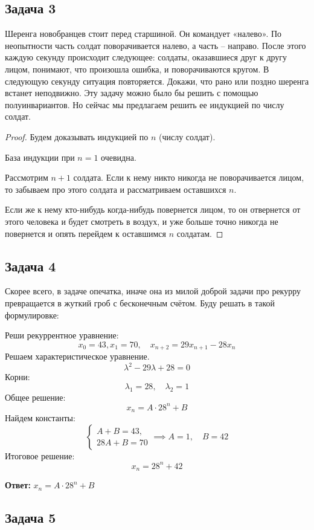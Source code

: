 \subsection{Задача 3}

Шеренга новобранцев стоит перед старшиной. Он командует «налево». По неопытности часть солдат поворачивается налево, а часть – направо. После этого каждую
секунду происходит следующее: солдаты, оказавшиеся друг к другу лицом, понимают, что произошла ошибка, и поворачиваются кругом. В следующую секунду ситуация
повторяется. Докажи, что рано или поздно шеренга встанет неподвижно.
Эту задачу можно было бы решить с помощью полуинвариантов. Но сейчас мы предлагаем
решить ее индукцией по числу солдат.

\begin{proof}
Будем доказывать индукцией по $n$ (числу солдат).

База индукции при $n = 1$ очевидна.

Рассмотрим $n + 1$ солдата. Если к нему никто никогда не поворачивается лицом, то забываем про этого солдата и рассматриваем оставшихся $n$.

Если же к нему кто-нибудь когда-нибудь повернется лицом, то он отвернется от этого человека и будет смотреть в воздух, и уже больше точно никогда не повернется и опять перейдем к оставшимся $n$ солдатам.
\end{proof}

\subsection{Задача 4}

Скорее всего, в задаче опечатка, иначе она из милой доброй задачи про рекурру превращается в жуткий гроб с бесконечным счётом. Буду решать в такой формулировке:

Реши рекуррентное уравнение:
\[
x_0 = 43, x_1 =70, \quad x_{n+2} = 29x_{n+1} - 28x_{n}
\]
Решаем характеристическое уравнение.
\[
\lambda^2 - 29\lambda + 28 = 0
\]
Корни:
\[
\lambda_1 = 28, \quad \lambda_2 = 1
\]
Общее решение:
\[
x_n = A \cdot 28^n + B
\]
Найдем константы:
\[
\begin{cases}
    A + B = 43, \\
    28A + B = 70
\end{cases} \implies A = 1, \quad B = 42
\]
Итоговое решение:
\[
x_n = 28^n + 42
\]

\textbf{Ответ:} $x_n = A \cdot 28^n + B$

\subsection{Задача 5}


